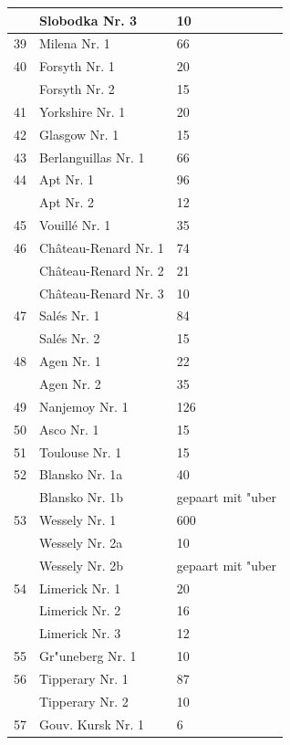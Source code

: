 \documentclass[a4paper, 11pt, oneside, polutonikogreek, german]{article}
\begin{document}
\begin{center}
\begin{longtable}{|l|l|l|}
          & Slobodka Nr. 3 & 10 \\ \hline
        39 & Milena Nr. 1 & 66 \\ \hline
        40 & Forsyth Nr. 1 & 20 \\ \hline
          & Forsyth Nr. 2 & 15 \\ \hline
        41 & Yorkshire Nr. 1 & 20 \\ \hline
        42 & Glasgow Nr. 1 & 15 \\ \hline
        43 & Berlanguillas Nr. 1 & 66 \\ \hline
        44 & Apt Nr. 1 & 96 \\ \hline
          & Apt Nr. 2 & 12 \\ \hline
        45 & Vouillé Nr. 1 & 35 \\ \hline
        46 & Château-Renard Nr. 1 & 74 \\ \hline
          & Château-Renard Nr. 2 & 21 \\ \hline
          & Château-Renard Nr. 3 & 10 \\ \hline
        47 & Salés Nr. 1 & 84 \\ \hline
          & Salés Nr. 2 & 15 \\ \hline
        48 & Agen Nr. 1 & 22 \\ \hline
          & Agen Nr. 2 & 35 \\ \hline
        49 & Nanjemoy Nr. 1 & 126 \\ \hline
        50 & Asco Nr. 1 & 15 \\ \hline
        51 & Toulouse Nr. 1 & 15 \\ \hline
        52 & Blansko Nr. 1a & 40 \\ \hline
          & Blansko Nr. 1b & gepaart mit "uber \\ \hline
        53 & Wessely Nr. 1 & 600 \\ \hline
          & Wessely Nr. 2a & 10 \\ \hline
          & Wessely Nr. 2b & gepaart mit "uber \\ \hline
        54 & Limerick Nr. 1 & 20 \\ \hline
          & Limerick Nr. 2 & 16 \\ \hline
          & Limerick Nr. 3 & 12 \\ \hline
        55 & Gr"uneberg Nr. 1 & 10 \\ \hline
        56 & Tipperary Nr. 1 & 87 \\ \hline
          & Tipperary Nr. 2 & 10 \\ \hline
        57 & Gouv. Kursk Nr. 1 & 6 \\ \hline

\end{longtable}
\end{center}
\end{document}
